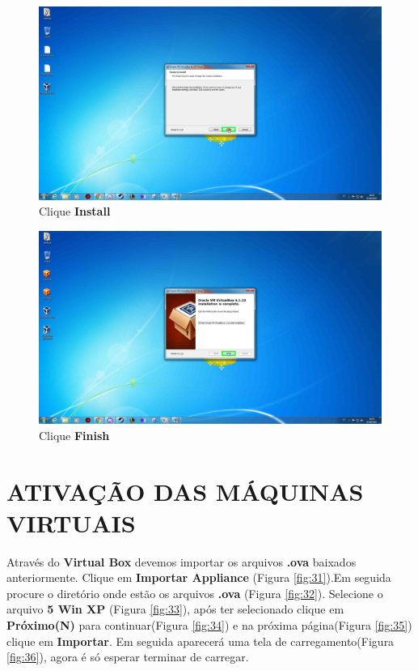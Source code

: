\documentclass[10pt]{article}
\begin{document}
\begin{figure}[H]
    \centering
    \caption{Clique \textbf{Install}}
    \label{fig:27}
    \includegraphics[width=\linewidth]{images/instalacao_virtualbox/007.png}
\end{figure}

\begin{figure}[H]
    \centering
    \caption{Clique \textbf{Finish}}
    \label{fig:28}
    \includegraphics[width=\linewidth]{images/instalacao_virtualbox/008.png}
\end{figure}



\section{ATIVAÇÃO DAS MÁQUINAS VIRTUAIS}
Através do \textbf{Virtual Box} devemos importar os arquivos \textbf{.ova} baixados anteriormente. Clique em \textbf{Importar Appliance} (Figura \ref{fig:31}).Em seguida procure o diretório onde estão os arquivos \textbf{.ova} (Figura \ref{fig:32}). Selecione o arquivo \textbf{5 Win XP} (Figura \ref{fig:33}), após ter selecionado clique em \textbf{Próximo(N)} para continuar(Figura \ref{fig:34}) e na próxima página(Figura \ref{fig:35}) clique em \textbf{Importar}. Em seguida aparecerá uma tela de carregamento(Figura \ref{fig:36}), agora é só esperar terminar de carregar.
\end{document}
